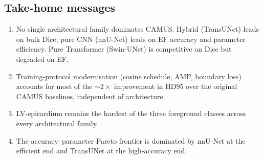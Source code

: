 \subsection{Take-home messages}
\label{sec:disc-takehome}

\begin{enumerate}[leftmargin=*,nosep]
\item No single architectural family dominates CAMUS. Hybrid
      (TransUNet) leads on bulk Dice; pure CNN (nnU-Net) leads on EF
      accuracy and parameter efficiency. Pure Transformer (Swin-UNet) is
      competitive on Dice but degraded on EF.
\item Training-protocol modernisation (cosine schedule, AMP, boundary
      loss) accounts for most of the $\sim$$2\times$ improvement in
      HD95 over the original CAMUS baselines, independent of
      architecture.
\item LV-epicardium remains the hardest of the three foreground classes
      across every architectural family.
\item The accuracy--parameter Pareto frontier is dominated by nnU-Net at
      the efficient end and TransUNet at the high-accuracy end.
\end{enumerate}
